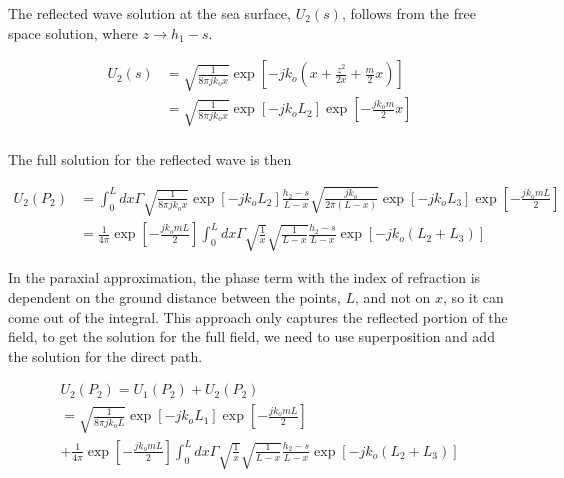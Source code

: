 The reflected wave solution at the sea surface, $U_2(s)$, follows from the free space solution, where $z \rightarrow h_1-s$.

\begin{equation}
\begin{aligned}
U_2(s) &= \sqrt{\frac{1}{8\pi jk_ox}}\exp\left[-jk_o\left(x+\frac{z^2}{2x} + \frac{m}{2}x\right)\right] \\
&=\sqrt{\frac{1}{8\pi jk_ox}}\exp\left[-jk_oL_2\right]\exp\left[-\frac{jk_om}{2}x\right] \\
\end{aligned}
\label{gf_eq:57}
\end{equation}
\renewcommand{\baselinestretch}{2} \small\normalsize

\noindent The full solution for the reflected wave is then 

\begin{equation}
\begin{aligned}
U_2(P_2) &= \int_0^L dx \Gamma \sqrt{\frac{1}{8\pi j k_o x}}\exp[-jk_oL_2]\frac{h_2-s}{L-x}\sqrt{\frac{jk_o}{2\pi(L-x)}}\exp[-jk_oL_3]\exp\left[-\frac{jk_omL}{2}\right]\\
&= \frac{1}{4\pi}\exp\left[-\frac{jk_omL}{2}\right]\int_0^L dx \Gamma \sqrt{\frac{1}{x}}\sqrt{\frac{1}{L-x}}\frac{h_2-s}{L-x}\exp\left[-jk_o\left(L_2+L_3\right) \right]
\label{gf_eq:58}
\end{aligned}
\end{equation}
\renewcommand{\baselinestretch}{2} \small\normalsize

In the paraxial approximation, the phase term with the index of refraction is dependent on the ground distance between the points, $L$, and not on $x$, so it can come out of the integral. This approach only captures the reflected portion of the field, to get the solution for the full field, we need to use superposition and add the solution for the direct path.

\begin{equation}
\begin{gathered}
U_2(P_2) = U_1(P_2) + U_2(P_2)\\
= \sqrt{\frac{1}{8\pi jk_oL}}\exp\left[-jk_oL_1\right]\exp\left[-\frac{jk_omL}{2}\right] \\
+ \frac{1}{4\pi}\exp\left[-\frac{jk_omL}{2}\right]\int_0^L dx \Gamma \sqrt{\frac{1}{x}}\sqrt{\frac{1}{L-x}}\frac{h_2-s}{L-x}\exp\left[-jk_o\left(L_2+L_3\right) \right]
\label{gf_eq:58a}
\end{gathered}
\end{equation}
\renewcommand{\baselinestretch}{2} \small\normalsize


